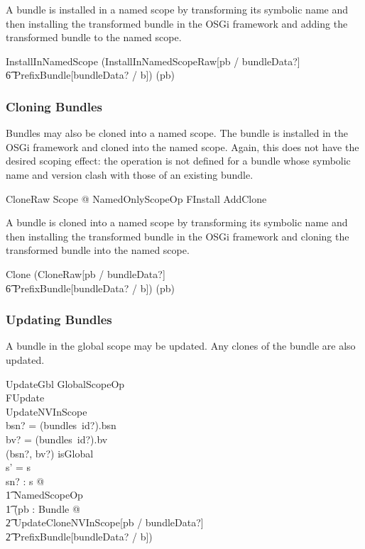 \documentclass[a4paper,12pt]{article}
\begin{document}
A bundle is installed in a named scope by transforming its symbolic name and then installing the transformed
bundle in the OSGi framework and adding the transformed bundle to the named scope.
\begin{zed}
InstallInNamedScope  (InstallInNamedScopeRaw[pb / bundleData?] \land \\
\t6 PrefixBundle[bundleData? / b]) \hide (pb) \\
\end{zed}

\subsubsection{Cloning Bundles}
Bundles may also be cloned into a named scope.
The bundle is installed in the OSGi framework and cloned into the named scope.
Again, this does not have the desired scoping effect: the operation is not defined for a bundle
whose symbolic name and version clash with those of an existing bundle.
\begin{zed}
CloneRaw  \exists \Delta Scope @ NamedOnlyScopeOp \land FInstall \land AddClone \\
\end{zed}

A bundle is cloned into a named scope by transforming its symbolic name and then installing the transformed
bundle in the OSGi framework and cloning the transformed bundle into the named scope.
\begin{zed}
Clone  (CloneRaw[pb / bundleData?] \land \\
\t6 PrefixBundle[bundleData? / b]) \hide (pb) \\
\end{zed}

\subsubsection{Updating Bundles}

A bundle in the global scope may be updated. Any clones of the bundle are also updated.
\begin{schema}{UpdateGbl}
GlobalScopeOp \\
FUpdate \\
UpdateNVInScope \\
\where
bsn? = (bundles~id?).bsn \\
bv? =  (bundles~id?).bv \\
(bsn?, bv?) \in isGlobal \\
\dom s' = \dom s \\
\forall sn? : \dom s @ \\
\t1 NamedScopeOp \land \\
\t1 (\exists pb : Bundle @ \\
\t2 UpdateCloneNVInScope[pb / bundleData?] \land \\
\t2 PrefixBundle[bundleData? / b]) \\
\end{schema}
\end{document}
